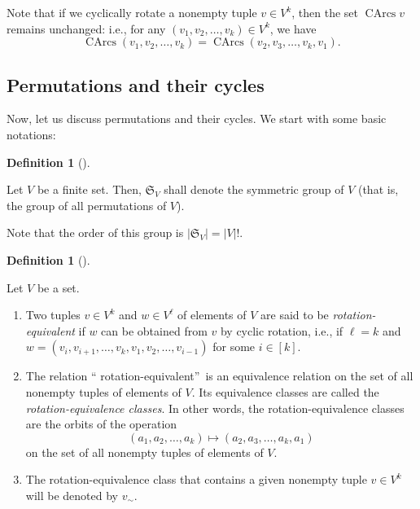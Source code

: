 \documentclass[numbers=enddot,12pt,final,onecolumn,notitlepage]{scrartcl}%
\numberwithin{exer}{section}
\theoremstyle{definition}
\newtheorem{defi}[theo]{Definition}
\newenvironment{definition}[1][]
{\begin{defi}[#1]\begin{leftbar}}
{\end{leftbar}\end{defi}}
\begin{document}
Note that if we cyclically rotate a nonempty tuple $v\in V^{k}$, then the set
$\operatorname*{CArcs}v$ remains unchanged: i.e., for any $\left(  v_{1}%
,v_{2},\ldots,v_{k}\right)  \in V^{k}$, we have%
\[
\operatorname*{CArcs}\left(  v_{1},v_{2},\ldots,v_{k}\right)
=\operatorname*{CArcs}\left(  v_{2},v_{3},\ldots,v_{k},v_{1}\right)  .
\]


\subsection{Permutations and their cycles}

Now, let us discuss permutations and their cycles. We start with some basic notations:

\begin{definition}
Let $V$ be a finite set. Then, $\mathfrak{S}_{V}$ shall denote the symmetric
group of $V$ (that is, the group of all permutations of $V$).
\end{definition}

Note that the order of this group is $\left\vert \mathfrak{S}_{V}\right\vert
=\left\vert V\right\vert !$.

\begin{definition}
Let $V$ be a set.

\begin{enumerate}
\item[\textbf{(a)}] Two tuples $v\in V^{k}$ and $w\in V^{\ell}$ of elements of
$V$ are said to be \emph{rotation-equivalent} if $w$ can be obtained from $v$
by cyclic rotation, i.e., if $\ell=k$ and $w=\left(  v_{i},v_{i+1}%
,\ldots,v_{k},v_{1},v_{2},\ldots,v_{i-1}\right)  $ for some $i\in\left[
k\right]  $.

\item[\textbf{(b)}] The relation \textquotedblleft
rotation-equivalent\textquotedblright\ is an equivalence relation on the set
of all nonempty tuples of elements of $V$. Its equivalence classes are called
the \emph{rotation-equivalence classes}. In other words, the
rotation-equivalence classes are the orbits of the operation%
\[
\left(  a_{1},a_{2},\ldots,a_{k}\right)  \mapsto\left(  a_{2},a_{3}%
,\ldots,a_{k},a_{1}\right)
\]
on the set of all nonempty tuples of elements of $V$.

\item[\textbf{(c)}] The rotation-equivalence class that contains a given
nonempty tuple $v\in V^{k}$ will be denoted by $v_{\sim}$.
\end{enumerate}
\end{definition}
\end{document}
